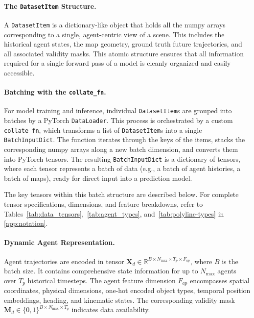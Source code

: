 \paragraph{The \texttt{DatasetItem} Structure.}
A \texttt{DatasetItem} is a dictionary-like object that holds all the numpy arrays corresponding to a single, agent-centric view of a scene. This includes the historical agent states, the map geometry, ground truth future trajectories, and all associated validity masks. This atomic structure ensures that all information required for a single forward pass of a model is cleanly organized and easily accessible.

\paragraph{Batching with the \texttt{collate\_fn}.}
For model training and inference, individual \texttt{DatasetItem}s are grouped into batches by a PyTorch \texttt{DataLoader}. This process is orchestrated by a custom \texttt{collate\_fn}, which transforms a list of \texttt{DatasetItem}s into a single \texttt{BatchInputDict}. The function iterates through the keys of the items, stacks the corresponding numpy arrays along a new batch dimension, and converts them into PyTorch tensors. The resulting \texttt{BatchInputDict} is a dictionary of tensors, where each tensor represents a batch of data (e.g., a batch of agent histories, a batch of maps), ready for direct input into a prediction model.

The key tensors within this batch structure are described below. For complete tensor specifications, dimensions, and feature breakdowns, refer to Tables~\ref{tab:data_tensors},~\ref{tab:agent_types}, and~\ref{tab:polyline-types} in \autoref{app:notation}.

\paragraph{Dynamic Agent Representation.}
Agent trajectories are encoded in tensor \(\boldsymbol{X}_d \in \mathbb{R}^{B \times N_{\max} \times T_p \times F_{ap}}\), where \(B\) is the batch size. It contains comprehensive state information for up to \(N_{\max}\) agents over \(T_p\) historical timesteps. The agent feature dimension \(F_{ap}\) encompasses spatial coordinates, physical dimensions, one-hot encoded object types, temporal position embeddings, heading, and kinematic states. The corresponding validity mask \(\boldsymbol{M}_d \in \{0,1\}^{B \times N_{\max} \times T_p}\) indicates data availability.

